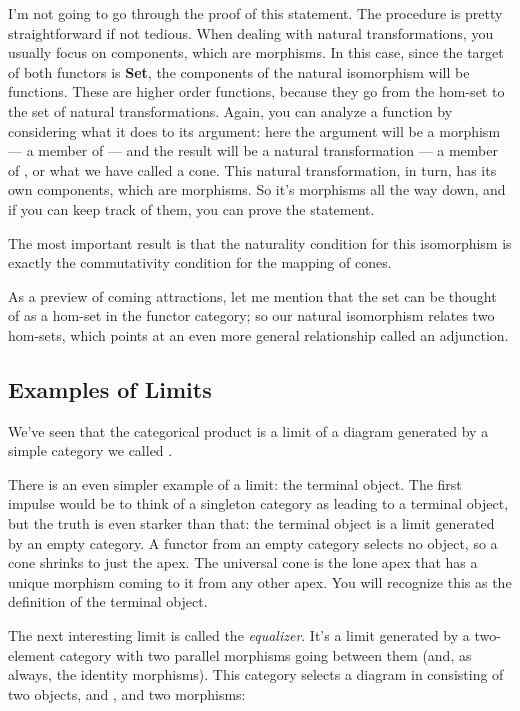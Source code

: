 I'm not going to go through the proof of this statement. The procedure
is pretty straightforward if not tedious. When dealing with natural
transformations, you usually focus on components, which are morphisms.
In this case, since the target of both functors is \textbf{Set}, the
components of the natural isomorphism will be functions. These are
higher order functions, because they go from the hom-set to the set of
natural transformations. Again, you can analyze a function by
considering what it does to its argument: here the argument will be a
morphism --- a member of  --- and the result will
be a natural transformation --- a member of , or
what we have called a cone. This natural transformation, in turn, has
its own components, which are morphisms. So it's morphisms all the way
down, and if you can keep track of them, you can prove the statement.

The most important result is that the naturality condition for this
isomorphism is exactly the commutativity condition for the mapping of
cones.

As a preview of coming attractions, let me mention that the set
 can be thought of as a hom-set in the functor
category; so our natural isomorphism relates two hom-sets, which points
at an even more general relationship called an adjunction.

\subsection{Examples of Limits}\label{examples-of-limits}

We've seen that the categorical product is a limit of a diagram
generated by a simple category we called .

There is an even simpler example of a limit: the terminal object. The
first impulse would be to think of a singleton category as leading to a
terminal object, but the truth is even starker than that: the terminal
object is a limit generated by an empty category. A functor from an
empty category selects no object, so a cone shrinks to just the apex.
The universal cone is the lone apex that has a unique morphism coming to
it from any other apex. You will recognize this as the definition of the
terminal object.

The next interesting limit is called the \emph{equalizer}. It's a limit
generated by a two-element category with two parallel morphisms going
between them (and, as always, the identity morphisms). This category
selects a diagram in  consisting of two objects,  and
, and two morphisms:

